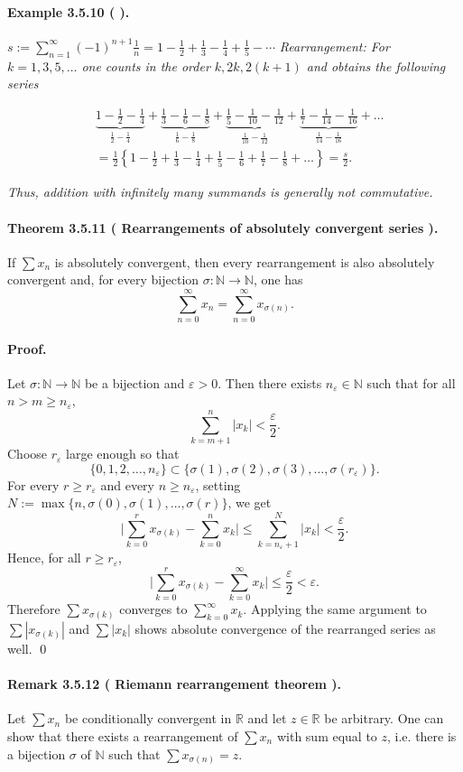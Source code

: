 \documentclass[12pt]{article}
\newcommand{\N}{\mathbb{N}}
\newcommand{\R}{\mathbb{R}}
\newcommand{\eps}{\varepsilon}
\newcommand{\NumberedTheorem}[3]{%
\paragraph*{Theorem #1 ( #2 ).} #3\par}
\newcommand{\NumberedRemark}[3]{%
\paragraph*{Remark #1 ( #2 ).} #3\par}
\newcommand{\NumberedExample}[3]{%
\paragraph*{Example #1 ( #2 ).} #3\par}
\begin{document}
\NumberedExample{3.5.10}{}{
$s := \sum_{n=1}^\infty (-1)^{n+1} \frac{1}{n} = 1 - \frac{1}{2} + \frac{1}{3} - \frac{1}{4} + \frac{1}{5} - \cdots$ \textit{Rearrangement: For $k = 1, 3, 5, \dots$ one counts in the order $k, 2k, 2(k+1)$ and obtains the following series}

\[
\begin{aligned}
&\underbrace{1 - \frac{1}{2} - \frac{1}{4}}_{\frac{1}{2} - \frac{1}{4}} + \underbrace{\frac{1}{3} - \frac{1}{6} - \frac{1}{8}}_{\frac{1}{6} - \frac{1}{8}} + \underbrace{\frac{1}{5} - \frac{1}{10} - \frac{1}{12}}_{\frac{1}{10} - \frac{1}{12}} + \underbrace{\frac{1}{7} - \frac{1}{14} - \frac{1}{16}}_{\frac{1}{14} - \frac{1}{16}} + \dots \\
&= \frac{1}{2} \left\{ 1 - \frac{1}{2} + \frac{1}{3} - \frac{1}{4} + \frac{1}{5} - \frac{1}{6} + \frac{1}{7} - \frac{1}{8} + \dots \right\} = \frac{s}{2}.
\end{aligned}
\]

\textit{Thus, addition with infinitely many summands is generally not commutative.}
}
	\NumberedTheorem{3.5.11}{Rearrangements of absolutely convergent series}{If $\sum x_n$ is absolutely convergent, then every rearrangement is also absolutely convergent and, for every bijection $\sigma:\N\to\N$, one has
	\[
		\sum_{n=0}^{\infty} x_n = \sum_{n=0}^{\infty} x_{\sigma(n)}.
	\]}
	\paragraph{Proof.}
	Let $\sigma:\N\to\N$ be a bijection and $\eps>0$. Then there exists $n_\eps\in\N$ such that for all $n>m\ge n_\eps$,
	\[
		\sum_{k=m+1}^{n} |x_k| < \frac{\eps}{2}.
	\]
	Choose $r_\eps$ large enough so that
	\[
		\{0,1,2,\dots,n_\eps\} \subset \{ \sigma(1),\sigma(2),\sigma(3),\dots,\sigma(r_\eps) \}.
	\]
	For every $r\ge r_\eps$ and every $n\ge n_\eps$, setting $N := \max\{n,\sigma(0),\sigma(1),\dots,\sigma(r)\}$, we get
	\[
		\Bigg| \sum_{k=0}^{r} x_{\sigma(k)} - \sum_{k=0}^{n} x_k \Bigg| \le \sum_{k=n_\eps+1}^{N} |x_k| < \frac{\eps}{2}.
	\]
	Hence, for all $r\ge r_\eps$,
	\[
		\Bigg| \sum_{k=0}^{r} x_{\sigma(k)} - \sum_{k=0}^{\infty} x_k \Bigg| \le \frac{\eps}{2} < \eps.
	\]
	Therefore $\sum x_{\sigma(k)}$ converges to $\sum_{k=0}^{\infty} x_k$. Applying the same argument to $\sum |x_{\sigma(k)}|$ and $\sum |x_k|$ shows absolute convergence of the rearranged series as well. \qed

	\NumberedRemark{3.5.12}{Riemann rearrangement theorem}{Let $\sum x_n$ be conditionally convergent in $\R$ and let $z\in\R$ be arbitrary. One can show that there exists a rearrangement of $\sum x_n$ with sum equal to $z$, i.e. there is a bijection $\sigma$ of $\N$ such that $\sum x_{\sigma(n)} = z$.}
\end{document}
